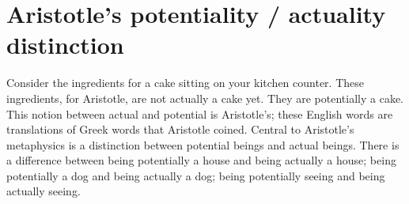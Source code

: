\documentclass[11pt]{article}
\begin{document}






\section*{Aristotle's potentiality / actuality distinction}

\noindent Consider the ingredients for a cake sitting on your kitchen counter. These ingredients, for Aristotle, are not actually a cake yet. They are potentially a cake. This notion between actual and potential is Aristotle's; these English words are translations of Greek words that Aristotle coined. Central to Aristotle's metaphysics is a distinction between potential beings and actual beings. There is a difference between being potentially a house and being actually a house; being potentially a dog and being actually a dog; being potentially seeing and being actually seeing.\\
\end{document}

